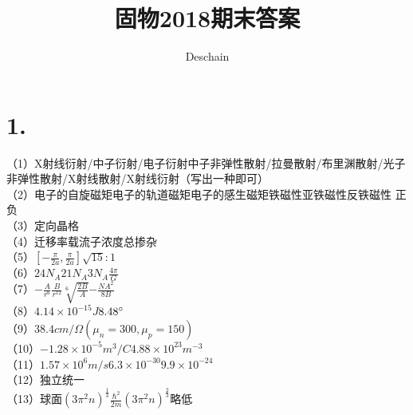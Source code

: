 \documentclass[UTF8]{ctexart}
\title{固物2018期末答案}
\author{Deschain}
\begin{document}
\maketitle
\section*{1.}
（1）X射线衍射/中子衍射/电子衍射中子非弹性散射/拉曼散射/布里渊散射/光子非弹性散射/X射线散射/X射线衍射（写出一种即可）\\
（2）电子的自旋磁矩电子的轨道磁矩电子的感生磁矩铁磁性亚铁磁性反铁磁性
正负\\
（3）定向晶格\\
（4）迁移率载流子浓度总掺杂\\
（5）$[-\frac{\pi}{2a},\frac{\pi}{2a}]$$\sqrt{15}:1$\\
（6）$24N_A$$21N_A$$3N_A$$\frac{4\pi}{G}$\\
（7）$-\frac{A}{r^6}$$\frac{B}{r^{12}}$$\sqrt[6]{\frac{2B}{A}}$$-\frac{NA^2}{8B}$\\
（8）$4.14\times10^{-15}J$$8.48\degree$\\
（9）$38.4cm/\Omega(\mu_n=300,\mu_p=150)$\\
（10）$-1.28\times10^{-5}m^3/C$$4.88\times10^{23}m^{-3}$\\
（11）$1.57\times10^{6}m/s$$6.3\times10^{-30}$$9.9\times10^{-24}$\\
（12）独立统一\\
（13）球面$(3\pi^2n)^{\frac{1}{3}}$$\frac{\hbar^2}{2m}(3\pi^2n)^{\frac{2}{3}}$略低\\
\end{document}
